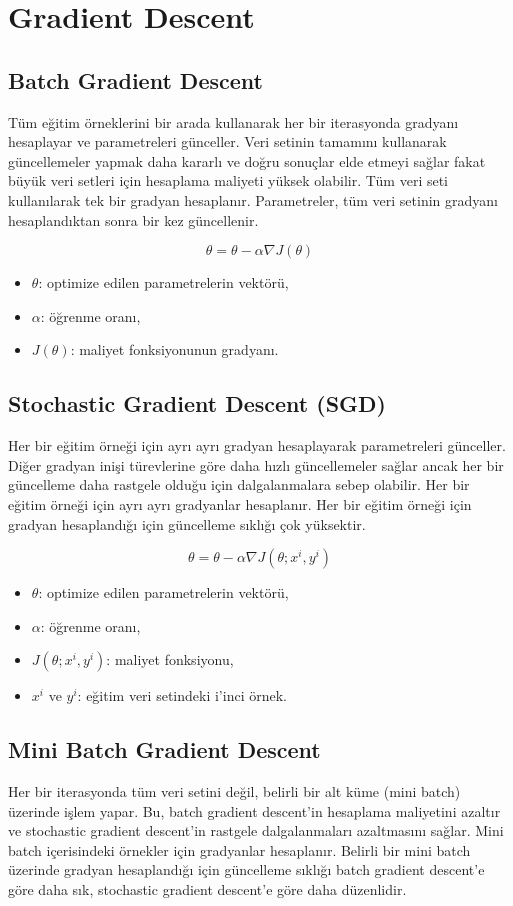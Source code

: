 \section{Gradient Descent}
\subsection{Batch Gradient Descent}
Tüm eğitim örneklerini bir arada kullanarak her bir iterasyonda gradyanı hesaplayar ve parametreleri günceller. Veri setinin tamamını kullanarak güncellemeler yapmak daha kararlı ve doğru sonuçlar elde etmeyi sağlar fakat büyük veri setleri için hesaplama maliyeti yüksek olabilir. Tüm veri seti kullanılarak tek bir gradyan hesaplanır. Parametreler, tüm veri setinin gradyanı hesaplandıktan sonra bir kez güncellenir.

\[\theta = \theta - \alpha \nabla J(\theta)\]
\begin{itemize}
	\item $\theta$: optimize edilen parametrelerin vektörü,
	\item $\alpha$: öğrenme oranı,
	\item $J(\theta)$: maliyet fonksiyonunun gradyanı.
\end{itemize}

\subsection{Stochastic Gradient Descent (SGD)}
Her bir eğitim örneği için ayrı ayrı gradyan hesaplayarak parametreleri günceller. Diğer gradyan inişi türevlerine göre daha hızlı güncellemeler sağlar ancak her bir güncelleme daha rastgele olduğu için dalgalanmalara sebep olabilir. Her bir eğitim örneği için ayrı ayrı gradyanlar hesaplanır. Her bir eğitim örneği için gradyan hesaplandığı için güncelleme sıklığı çok yüksektir.

\[\theta = \theta - \alpha \nabla J(\theta; x^{i}, y^{i} )\]
\begin{itemize}
	\item $\theta$: optimize edilen parametrelerin vektörü,
	\item $\alpha$: öğrenme oranı,
	\item $J(\theta; x^{i}, y^{i} )$: maliyet fonksiyonu,
	\item $x^{i}$ ve $y^{i}$: eğitim veri setindeki i'inci örnek.
\end{itemize}

\subsection{Mini Batch Gradient Descent}
Her bir iterasyonda tüm veri setini değil, belirli bir alt küme (mini batch) üzerinde işlem yapar. Bu, batch gradient descent'in hesaplama maliyetini azaltır ve stochastic gradient descent'in rastgele dalgalanmaları azaltmasını sağlar. Mini batch içerisindeki örnekler için gradyanlar hesaplanır. Belirli bir mini batch üzerinde gradyan hesaplandığı için güncelleme sıklığı batch gradient descent'e göre daha sık, stochastic gradient descent'e göre daha düzenlidir.

